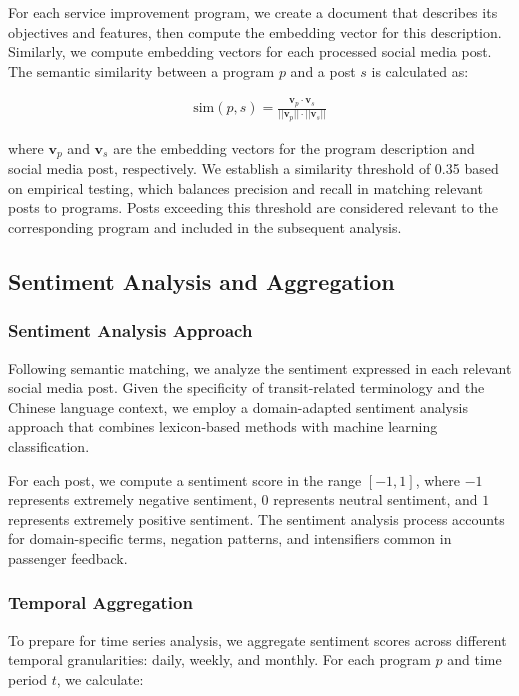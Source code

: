 \documentclass[a4paper,fleqn,12pt]{cas-sc}
\begin{document}
For each service improvement program, we create a document that describes its objectives and features, then compute the embedding vector for this description. Similarly, we compute embedding vectors for each processed social media post. The semantic similarity between a program $p$ and a post $s$ is calculated as:

\begin{align}
\text{sim}(p, s) = \frac{\mathbf{v}_p \cdot \mathbf{v}_s}{||\mathbf{v}_p|| \cdot ||\mathbf{v}_s||}
\end{align}

where $\mathbf{v}_p$ and $\mathbf{v}_s$ are the embedding vectors for the program description and social media post, respectively. We establish a similarity threshold of 0.35 based on empirical testing, which balances precision and recall in matching relevant posts to programs. Posts exceeding this threshold are considered relevant to the corresponding program and included in the subsequent analysis.

\subsection{Sentiment Analysis and Aggregation}

\subsubsection{Sentiment Analysis Approach}

Following semantic matching, we analyze the sentiment expressed in each relevant social media post. Given the specificity of transit-related terminology and the Chinese language context, we employ a domain-adapted sentiment analysis approach that combines lexicon-based methods with machine learning classification.

For each post, we compute a sentiment score in the range $[-1, 1]$, where $-1$ represents extremely negative sentiment, $0$ represents neutral sentiment, and $1$ represents extremely positive sentiment. The sentiment analysis process accounts for domain-specific terms, negation patterns, and intensifiers common in passenger feedback.

\subsubsection{Temporal Aggregation}

To prepare for time series analysis, we aggregate sentiment scores across different temporal granularities: daily, weekly, and monthly. For each program $p$ and time period $t$, we calculate:
\end{document}
